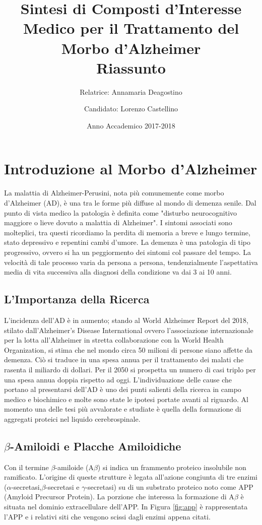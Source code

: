 \documentclass[a4paper, 11pt]{article}
\title{{\large Sintesi di Composti d'Interesse Medico per il Trattamento del Morbo d'Alzheimer} \\ {\large Riassunto}}
\author{{\small
			Relatrice: Annamaria Deagostino}
	\and
	{\small Candidato: Lorenzo Castellino
	}}
\date{{\small Anno Accademico 2017-2018}}
\begin{document}
\maketitle


\section{Introduzione al Morbo d'Alzheimer}
La malattia di Alzheimer-Perusini, nota più comunemente come morbo d'Alzheimer (AD), è una tra le forme più diffuse al mondo di demenza senile. Dal punto di vista medico la patologia è definita come "disturbo neurocognitivo maggiore o lieve dovuto a malattia di Alzheimer". I sintomi associati sono molteplici, tra questi ricordiamo la perdita di memoria a breve e lungo termine, stato depressivo e repentini cambi d'umore. La demenza è una patologia di tipo progressivo, ovvero si ha un peggiormento dei sintomi col passare del tempo. La velocità di tale processo varia da persona a persona, tendenzialmente l'aspettativa media di vita successiva alla diagnosi della condizione va dai 3 ai 10 anni. \cite{todd_survival_2013}

\subsection{L'Importanza della Ricerca}
L'incidenza dell'AD è in aumento; stando al World Alzheimer Report del 2018, stilato dall'Alzheimer's Disease International ovvero l'associazione internazionale per la lotta all'Alzheimer in stretta collaborazione con la World Health Organization, si stima che nel mondo circa 50 milioni di persone siano affette da demenza. Ciò si traduce in una spesa annua per il trattamento dei malati che rasenta il miliardo di dollari. Per il 2050 si prospetta un numero di casi triplo per una spesa annua doppia rispetto ad oggi. \cite{noauthor_world_2018}
L'individuazione delle cause che portano al presentarsi dell'AD è uno dei punti salienti della ricerca in campo medico e biochimico e molte sono state le ipotesi portate avanti al riguardo. Al momento una delle tesi più avvalorate e studiate è quella della formazione di aggregati proteici nel liquido cerebrospinale.

\subsection{$\beta$-Amiloidi e Placche Amiloidiche}
Con il termine $\beta$-amiloide (A$\beta$) si indica un frammento proteico insolubile non ramificato.
L'origine di queste strutture è legata all'azione congiunta di tre enzimi ($\alpha$-secretasi,$\beta$-secretasi e $\gamma$-secretasi) su di un substrato proteico noto come APP (Amyloid Precursor Protein). La porzione che interessa la formazione di A$\beta$ è situata nel dominio extracellulare dell'APP. In Figura \ref{fig:app} è rappresentata l'APP e i relativi siti che vengono scissi dagli enzimi appena citati. \cite{goedert_century_2006}
\end{document}
